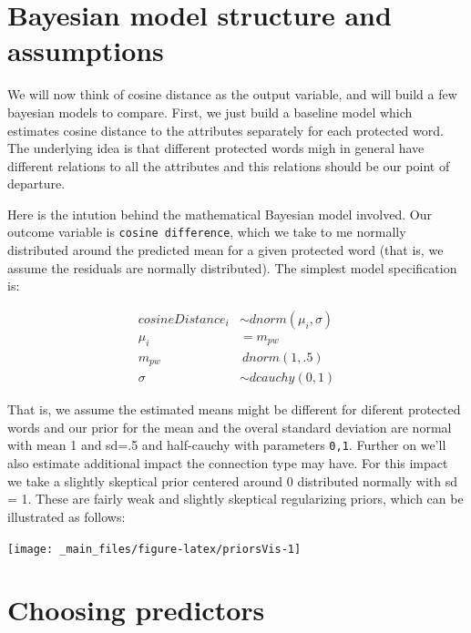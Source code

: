 \documentclass[12pt,]{book}
\begin{document}
\section{Bayesian model structure and
assumptions}\label{bayesian-model-structure-and-assumptions}

We will now think of cosine distance as the output variable, and will
build a few bayesian models to compare. First, we just build a baseline
model which estimates cosine distance to the attributes separately for
each protected word. The underlying idea is that different protected
words migh in general have different relations to all the attributes and
this relations should be our point of departure.

Here is the intution behind the mathematical Bayesian model involved.
Our outcome variable is \texttt{cosine\ difference}, which we take to me
normally distributed around the predicted mean for a given protected
word (that is, we assume the residuals are normally distributed). The
simplest model specification is:

\begin{align}
cosineDistance_i  & \sim dnorm(\mu_i, \sigma) \\
\mu_i & = m_{pw} \\
m_{pw} & ~ dnorm(1,.5) \\
\sigma &\sim  dcauchy(0,1)
\end{align}

That is, we assume the estimated means might be different for diferent
protected words and our prior for the mean and the overal standard
deviation are normal with mean 1 and sd=.5 and half-cauchy with
parameters \texttt{0,1}. Further on we'll also estimate additional
impact the connection type may have. For this impact we take a slightly
skeptical prior centered around 0 distributed normally with sd = 1.
These are fairly weak and slightly skeptical regularizing priors, which
can be illustrated as follows:

\vspace{2mm}

\begin{center}\texttt{[image: \_main\_files/figure-latex/priorsVis-1]} \end{center}

\section{Choosing predictors}\label{choosing-predictors}
\end{document}
